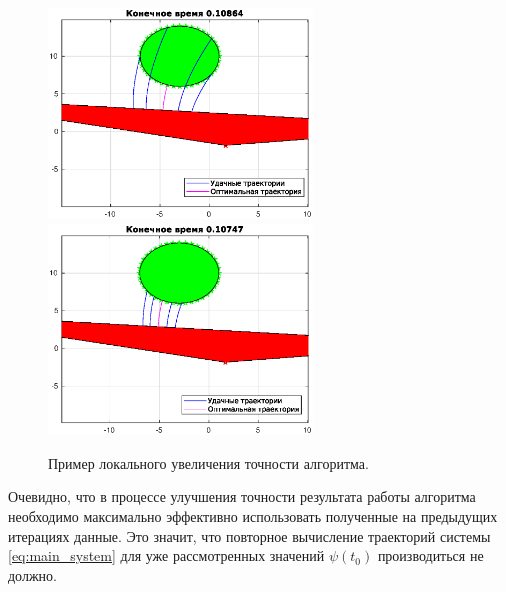 \begin{description}
        \begin{figure}[h]
                \hfill
                \includegraphics[width=70mm]{algorithm/improvement-1.eps}
                \hfill
                \hfill
                \includegraphics[width=70mm]{algorithm/improvement-2.eps}
                \hfill
                \caption{Пример локального увеличения точности алгоритма.}
        \end{figure}
\end{description}

\begin{remark}
        Очевидно, что в процессе улучшения точности результата работы алгоритма необходимо максимально эффективно использовать полученные на предыдущих итерациях данные. Это значит, что повторное вычисление траекторий системы \eqref{eq:main_system} для уже рассмотренных значений $\psi(t_0)$ производиться не должно.
\end{remark}